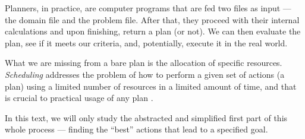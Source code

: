 Planners, in practice, are computer programs that are fed two files as input
--- the domain file and the problem file. After that, they proceed with their internal calculations
and upon finishing, return a plan (or not). 
We can then evaluate the plan, see if it meets our criteria, and, potentially,
execute it in the real world.

What we are missing from a bare plan is the allocation of specific resources.
\textit{Scheduling} addresses the problem of how to perform a given set of actions (a plan)
using a limited number of resources in a limited amount of time, and
that is crucial to practical usage of any plan \citep[Chapter~15]{Ghallab2004}.

In this text, we will only study the abstracted and simplified first part of this whole process
--- finding the ``best'' actions that lead to a specified goal.


















